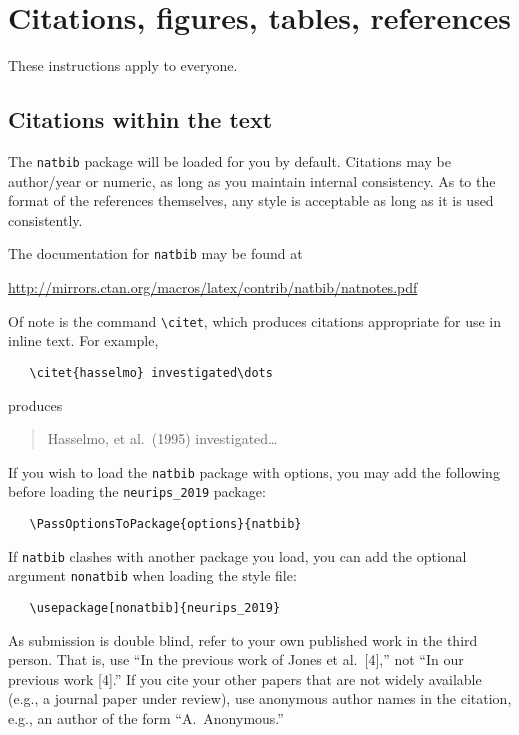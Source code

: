 \documentclass{article}
\begin{document}
\section{Citations, figures, tables, references}
\label{others}

These instructions apply to everyone.

\subsection{Citations within the text}

The \verb+natbib+ package will be loaded for you by default.  Citations may be
author/year or numeric, as long as you maintain internal consistency.  As to the
format of the references themselves, any style is acceptable as long as it is
used consistently.

The documentation for \verb+natbib+ may be found at
\begin{center}
  \url{http://mirrors.ctan.org/macros/latex/contrib/natbib/natnotes.pdf}
\end{center}
Of note is the command \verb+\citet+, which produces citations appropriate for
use in inline text.  For example,
\begin{verbatim}
   \citet{hasselmo} investigated\dots
\end{verbatim}
produces
\begin{quote}
  Hasselmo, et al.\ (1995) investigated\dots
\end{quote}

If you wish to load the \verb+natbib+ package with options, you may add the
following before loading the \verb+neurips_2019+ package:
\begin{verbatim}
   \PassOptionsToPackage{options}{natbib}
\end{verbatim}

If \verb+natbib+ clashes with another package you load, you can add the optional
argument \verb+nonatbib+ when loading the style file:
\begin{verbatim}
   \usepackage[nonatbib]{neurips_2019}
\end{verbatim}

As submission is double blind, refer to your own published work in the third
person. That is, use ``In the previous work of Jones et al.\ [4],'' not ``In our
previous work [4].'' If you cite your other papers that are not widely available
(e.g., a journal paper under review), use anonymous author names in the
citation, e.g., an author of the form ``A.\ Anonymous.''
\end{document}
